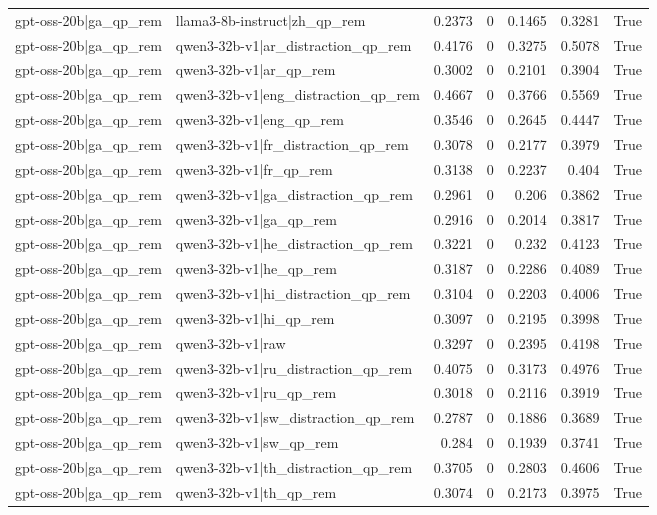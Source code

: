 \begin{table}
\begin{tabular}{l l r r r r l}
gpt-oss-20b|ga_qp_rem & llama3-8b-instruct|zh_qp_rem & 0.2373 & 0 & 0.1465 & 0.3281 & True \\
gpt-oss-20b|ga_qp_rem & qwen3-32b-v1|ar_distraction_qp_rem & 0.4176 & 0 & 0.3275 & 0.5078 & True \\
gpt-oss-20b|ga_qp_rem & qwen3-32b-v1|ar_qp_rem & 0.3002 & 0 & 0.2101 & 0.3904 & True \\
gpt-oss-20b|ga_qp_rem & qwen3-32b-v1|eng_distraction_qp_rem & 0.4667 & 0 & 0.3766 & 0.5569 & True \\
gpt-oss-20b|ga_qp_rem & qwen3-32b-v1|eng_qp_rem & 0.3546 & 0 & 0.2645 & 0.4447 & True \\
gpt-oss-20b|ga_qp_rem & qwen3-32b-v1|fr_distraction_qp_rem & 0.3078 & 0 & 0.2177 & 0.3979 & True \\
gpt-oss-20b|ga_qp_rem & qwen3-32b-v1|fr_qp_rem & 0.3138 & 0 & 0.2237 & 0.404 & True \\
gpt-oss-20b|ga_qp_rem & qwen3-32b-v1|ga_distraction_qp_rem & 0.2961 & 0 & 0.206 & 0.3862 & True \\
gpt-oss-20b|ga_qp_rem & qwen3-32b-v1|ga_qp_rem & 0.2916 & 0 & 0.2014 & 0.3817 & True \\
gpt-oss-20b|ga_qp_rem & qwen3-32b-v1|he_distraction_qp_rem & 0.3221 & 0 & 0.232 & 0.4123 & True \\
gpt-oss-20b|ga_qp_rem & qwen3-32b-v1|he_qp_rem & 0.3187 & 0 & 0.2286 & 0.4089 & True \\
gpt-oss-20b|ga_qp_rem & qwen3-32b-v1|hi_distraction_qp_rem & 0.3104 & 0 & 0.2203 & 0.4006 & True \\
gpt-oss-20b|ga_qp_rem & qwen3-32b-v1|hi_qp_rem & 0.3097 & 0 & 0.2195 & 0.3998 & True \\
gpt-oss-20b|ga_qp_rem & qwen3-32b-v1|raw & 0.3297 & 0 & 0.2395 & 0.4198 & True \\
gpt-oss-20b|ga_qp_rem & qwen3-32b-v1|ru_distraction_qp_rem & 0.4075 & 0 & 0.3173 & 0.4976 & True \\
gpt-oss-20b|ga_qp_rem & qwen3-32b-v1|ru_qp_rem & 0.3018 & 0 & 0.2116 & 0.3919 & True \\
gpt-oss-20b|ga_qp_rem & qwen3-32b-v1|sw_distraction_qp_rem & 0.2787 & 0 & 0.1886 & 0.3689 & True \\
gpt-oss-20b|ga_qp_rem & qwen3-32b-v1|sw_qp_rem & 0.284 & 0 & 0.1939 & 0.3741 & True \\
gpt-oss-20b|ga_qp_rem & qwen3-32b-v1|th_distraction_qp_rem & 0.3705 & 0 & 0.2803 & 0.4606 & True \\
gpt-oss-20b|ga_qp_rem & qwen3-32b-v1|th_qp_rem & 0.3074 & 0 & 0.2173 & 0.3975 & True \\

\end{tabular}
\end{table}
